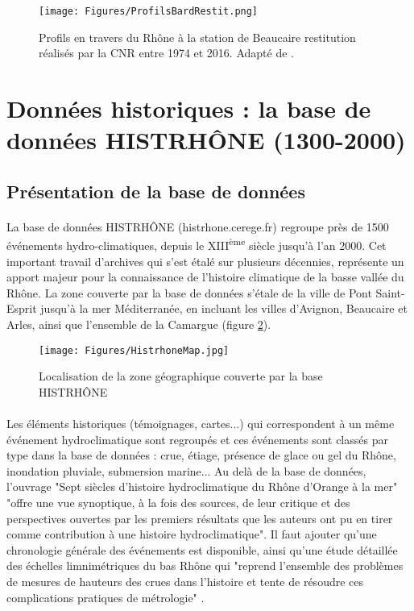 \documentclass[11pt]{article}
\begin{document}
	\begin{figure}[h]
	\centering
		\texttt{[image: Figures/ProfilsBardRestit.png]}
        \caption{Profils en travers du Rhône à la station de Beaucaire restitution réalisés par la CNR entre 1974 et 2016. Adapté de \cite{bard_actualisation_2018}.}	
		\label{fig:ProfilsRestit}
	\end{figure}
	
       
\FloatBarrier


\section{Données historiques : la base de données HISTRHÔNE (1300-2000)}

	\subsection{Présentation de la base de données}

	\paragraph{} La base de données HISTRHÔNE (histrhone.cerege.fr) \citep{pichard_sept_2014} regroupe près de 1500 événements hydro-climatiques, depuis le XIII\textsuperscript{ème} siècle jusqu'à l'an 2000. Cet important travail d'archives qui s'est étalé sur plusieurs décennies, représente un apport majeur pour la connaissance de l'histoire climatique de la basse vallée du Rhône. La zone couverte par la base de données s'étale de la ville de Pont Saint-Esprit jusqu'à la mer Méditerranée, en incluant les villes d'Avignon, Beaucaire et Arles, ainsi que l'ensemble de la Camargue (figure \ref{fig:MapHistrhone}). 
	
	\begin{figure}[h]
	\centering
		\texttt{[image: Figures/HistrhoneMap.jpg]}
        \caption{Localisation de la zone géographique couverte par la base HISTRHÔNE \citep{pichard_sept_2014} }
		\label{fig:MapHistrhone}
	\end{figure}
	
	\paragraph{} Les éléments historiques (témoignages, cartes...) qui correspondent à un même événement hydroclimatique sont regroupés et ces événements sont classés par type dans la base de données : crue, étiage, présence de glace ou gel du Rhône, inondation pluviale, submersion marine... Au delà de la base de données, l'ouvrage "Sept siècles d'histoire hydroclimatique du Rhône d'Orange à la mer" \citep{pichard_sept_2014} "offre une vue synoptique, à la fois des sources, de leur critique et des perspectives ouvertes par les premiers résultats que les auteurs ont pu en tirer comme contribution à une histoire hydroclimatique". Il faut ajouter qu'une chronologie générale des événements est disponible, ainsi qu'une étude détaillée des échelles limnimétriques du bas Rhône qui "reprend l'ensemble des problèmes de mesures de hauteurs des crues dans l'histoire et tente de résoudre ces complications pratiques de métrologie" \citep{pichard_hauteurs_2013} .
	
\end{document}
